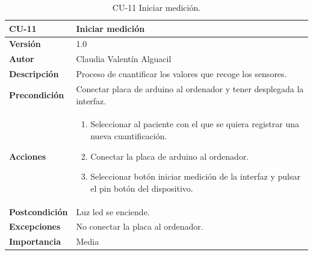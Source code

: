 \begin{table}[p]
	\centering
	\begin{tabularx}{\linewidth}{ p{} p{} }
		\toprule
		\textbf{CU-11}    & \textbf{Iniciar medición}\\
		\toprule
		\textbf{Versión}              & 1.0    \\
		\textbf{Autor}                & Claudia Valentín Alguacil \\
		 
		\textbf{Descripción}          & Proceso de cuantificar los valores que recoge los sensores. \\
		\textbf{Precondición}         & Conectar placa de arduino al ordenador y tener desplegada la interfaz. \\
		\textbf{Acciones}             &
		\begin{enumerate}
			\def\labelenumi{\arabic{enumi}.}
			\tightlist
			\item Seleccionar al paciente con el que se quiera registrar una nueva cuantificación.
			\item Conectar la placa de arduino al ordenador.
                \item Seleccionar botón iniciar medición de la interfaz y pulsar el pin botón del dispositivo.
		\end{enumerate}\\
		\textbf{Postcondición}        &  Luz led se enciende.\\
		\textbf{Excepciones}          & No conectar la placa al ordenador. \\
		\textbf{Importancia}          & Media \\
		\bottomrule
	\end{tabularx}
	\caption{CU-11 Iniciar medición.}
\end{table}

